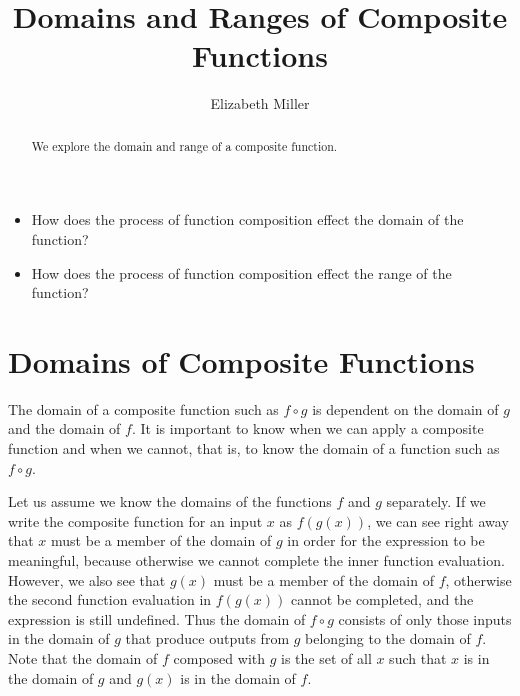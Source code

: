 \documentclass{ximera}
\author{Elizabeth Miller}
\title{Domains and Ranges of Composite Functions}
\begin{document}
\begin{abstract}
   We explore the domain and range of a composite function.
\end{abstract}
\maketitle



\begin{motivatingQuestions}\begin{itemize}
\item How does the process of function composition effect the domain of the function?
\item How does the process of function composition effect the range of the function?
\end{itemize}\end{motivatingQuestions}



\section{Domains of Composite Functions}
The domain of a composite function such as $f \circ g$ is dependent on the domain of $g$ and the domain of $f$. It is important to know when we can apply a composite function and when we cannot, that is, to know the domain of a function such as $f  \circ g$. 

Let us assume we know the domains of the functions $f$ and $g$ separately. If we write the composite function for an input $x$ as $f(g(x))$, we can see right away that $x$ must be a member of the domain of $g$ in order for the expression to be meaningful, because otherwise we cannot complete the inner function evaluation. However, we also see that $g(x)$ must be a member of the domain of $f$, otherwise the second function evaluation in $f(g(x))$ cannot be completed, and the expression is still undefined. Thus the domain of $f \circ g$ consists of only those inputs in the domain of $g$ that produce outputs from $g$ belonging to the domain of $f$. Note that the domain of $f$ composed with $g$ is the set of all $x$ such that $x$ is in the domain of $g$ and $g(x)$ is in the domain of $f$.
\end{document}
